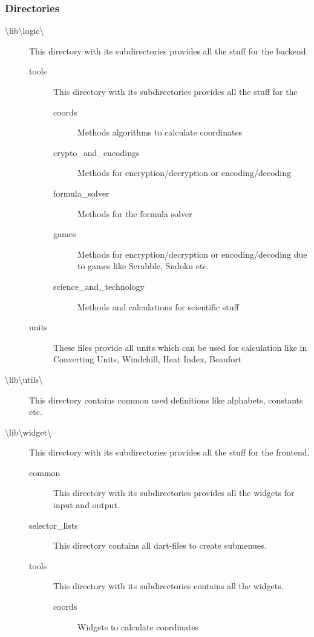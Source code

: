 \subsubsection{Directories}
\begin{description}
    \item[\textbackslash lib\textbackslash logic\textbackslash] This directory with its subdirectories provides all the stuff for the backend.
    \begin{description}
        \item[tools] This directory with its subdirectories provides all the stuff for the
        \begin{description}
            \item[coords] Methods algorithms to calculate coordinates
            \item[crypto\_and\_encodings] Methods for encryption/decryption or encoding/decoding
            \item[formula\_solver] Methods for the formula solver
            \item[games] Methods for encryption/decryption or encoding/decoding due to games like Scrabble, Sudoku etc.
            \item[science\_and\_technology] Methods and calculations for scientific stuff
        \end{description}
        \item[units] These files provide all units which can be used for calculation like in Converting Units, Windchill, Heat Index, Beaufort
    \end{description}
    \item[\textbackslash lib\textbackslash utils\textbackslash] This directory contains common used definitions like alphabets, constants etc.
    \item[\textbackslash lib\textbackslash widget\textbackslash] This directory with its subdirectories provides all the stuff for the frontend.
    \begin{description}
        \item[common] This directory with its subdirectories provides all the widgets for input and output.
        \item[selector\_lists] This directory contains all dart-files to create submenues.
        \item[tools] This directory with its subdirectories contains all the widgets.
        \begin{description}
            \item[coords] Widgets to calculate coordinates

\end{description}
\end{description}
\end{description}

